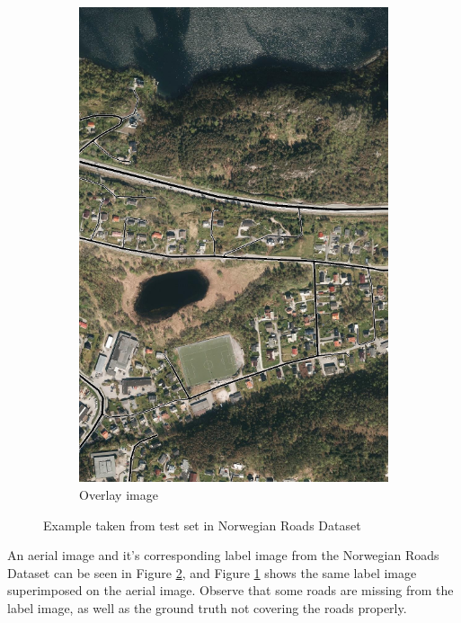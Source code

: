 \begin{figure}
\begin{subfigure}{0.32\textwidth}
\includegraphics[width=\linewidth]{figs/datasets/Norwegian_roads_overlay_example2.png}
\caption{Overlay image} \label{fig:norwegian_roads_example_overlay}
\end{subfigure}
\hspace*{\fill} %
\caption{Example taken from test set in Norwegian Roads Dataset} \label{fig:norwegian_roads_example}
\end{figure}

An aerial image and it's corresponding label image from the Norwegian Roads Dataset can be seen in Figure \ref{fig:norwegian_roads_example}, and Figure \ref{fig:norwegian_roads_example_overlay} shows the same label image superimposed on the aerial image. Observe that some roads are missing from the label image, as well as the ground truth not covering the roads properly. \\

